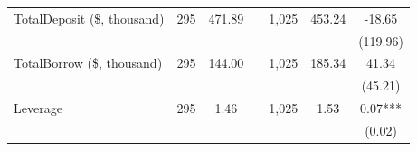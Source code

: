 \begin{table}[ht!]
\begin{tabular*}{\linewidth}{@{\extracolsep{\fill}}lcccccc }
    TotalDeposit (\$, thousand) & 295   & 471.89 &       & 1,025 & 453.24 & -18.65 \\
          &       &       &       &       &       & (119.96) \\
    TotalBorrow (\$, thousand) & 295   & 144.00 &       & 1,025 & 185.34 & 41.34 \\
          &       &       &       &       &       & (45.21) \\
    Leverage & 295   & 1.46  &       & 1,025 & 1.53  & 0.07*** \\
          &       &       &       &       &       & (0.02) \\
    \bottomrule
    
          \end{tabular*} 



\end{table}%





